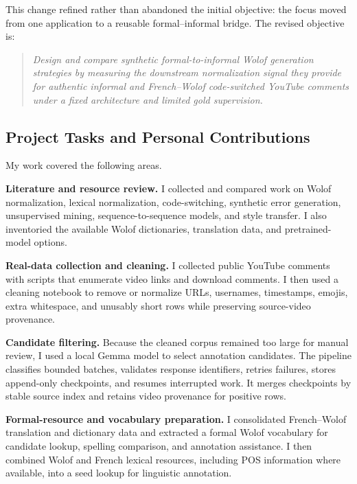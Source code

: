 \documentclass[12pt, a4paper, twoside, openany]{report}
\begin{document}
This change refined rather than abandoned the initial objective: the focus moved from one application to a reusable formal--informal bridge. The revised objective is:

\begin{quote}
	\textit{Design and compare synthetic formal-to-informal Wolof generation strategies by measuring the downstream normalization signal they provide for authentic informal and French--Wolof code-switched YouTube comments under a fixed architecture and limited gold supervision.}
\end{quote}


\subsection{Project Tasks and Personal Contributions}

My work covered the following areas.

\noindent\textbf{Literature and resource review.}
I collected and compared work on Wolof normalization, lexical normalization, code-switching, synthetic error generation, unsupervised mining, sequence-to-sequence models, and style transfer. I also inventoried the available Wolof dictionaries, translation data, and pretrained-model options.

\noindent\textbf{Real-data collection and cleaning.}
I collected public YouTube comments with scripts that enumerate video links and download comments. I then used a cleaning notebook to remove or normalize URLs, usernames, timestamps, emojis, extra whitespace, and unusably short rows while preserving source-video provenance.

\noindent\textbf{Candidate filtering.}
Because the cleaned corpus remained too large for manual review, I used a local Gemma model to select annotation candidates. The pipeline classifies bounded batches, validates response identifiers, retries failures, stores append-only checkpoints, and resumes interrupted work. It merges checkpoints by stable source index and retains video provenance for positive rows.

\noindent\textbf{Formal-resource and vocabulary preparation.}
I consolidated French--Wolof translation and dictionary data and extracted a formal Wolof vocabulary for candidate lookup, spelling comparison, and annotation assistance. I then combined Wolof and French lexical resources, including POS information where available, into a seed lookup for linguistic annotation.
\end{document}
